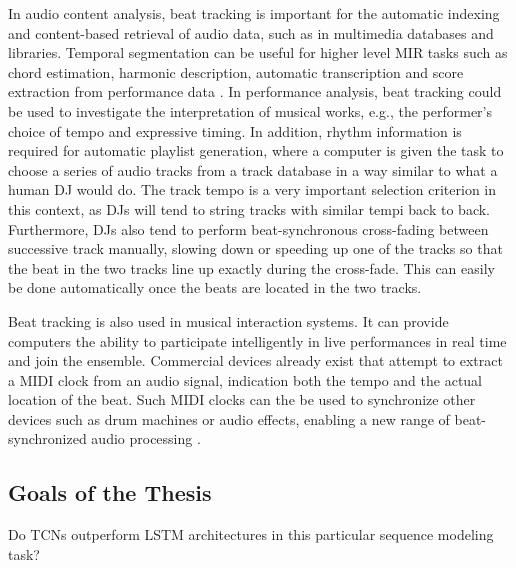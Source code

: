 \documentclass{scrartcl}
\begin{document}

In audio content analysis, beat tracking is important for the automatic indexing and content-based retrieval of audio data, such as in multimedia databases and libraries. Temporal segmentation can be useful for higher level MIR tasks such as chord estimation, harmonic description, automatic transcription and score extraction from performance data \cite{Bello2005b}. In performance analysis, beat tracking could be used to investigate the interpretation of musical works, e.g., the performer's choice of tempo and expressive timing. In addition, rhythm information is required for automatic playlist generation, where a computer is given the task to choose a series of audio tracks from a track database in a way similar to what a human DJ would do. The track tempo is a very important selection criterion in this context, as DJs will tend to string tracks with similar tempi back to back. Furthermore, DJs also tend to perform beat-synchronous cross-fading between successive track manually, slowing down or speeding up one of the tracks so that the beat in the two tracks line up exactly during the cross-fade. This can easily be done automatically once the beats are located in the two tracks.


Beat tracking is also used in musical interaction systems. It can provide computers the ability to participate intelligently in live performances in real time and join the ensemble. Commercial devices already exist that attempt to extract a MIDI clock from an audio signal, indication both the tempo and the actual location of the beat. Such MIDI clocks can the be used to synchronize other devices such as drum machines or audio effects, enabling a new range of beat-synchronized audio processing \cite{Robertson2007}. 


\subsection{Goals of the Thesis}

Do TCNs outperform LSTM architectures in this particular sequence modeling task?
\end{document}
